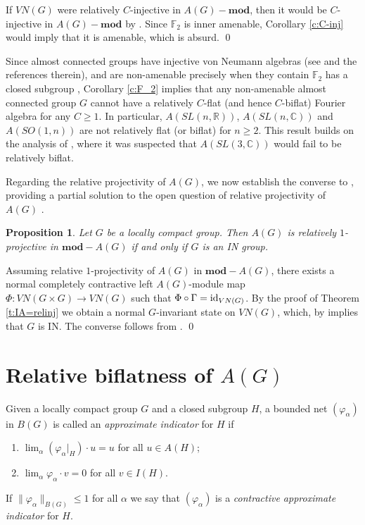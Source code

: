 \documentclass[preprint,12pt]{elsarticle}
\newtheorem{prop}[thm]{Proposition}
\newcommand{\e}[1]{\emph{#1}}
\newcommand{\LG}{VN(G)}
\newcommand{\vphi}{\varphi}
\newcommand{\Gam}{\Gamma}
\newcommand{\id}{\textnormal{id}}
\providecommand{\norm}[1]{\lVert#1\rVert}
\newcommand{\F}{\mathbb{F}}
\newcommand{\C}{\mathbb{C}}
\newcommand{\R}{\mathbb{R}}
\begin{document}
\begin{pf} If $\LG$ were relatively $C$-injective in $A(G)-\mathbf{mod}$, then it would be $C$-injective in $A(G)-\mathbf{mod}$ by \cite[Proposition 2.3]{C}. Since $\F_2$ is inner amenable, Corollary \ref{c:C-inj} would imply that it is amenable, which is absurd.
\qed\end{pf}

Since almost connected groups have injective von Neumann algebras (see \cite{Pat3} and the references therein), and are non-amenable precisely when they contain $\F_2$ has a closed subgroup \cite[Theorem 5.5]{Rick}, Corollary \ref{c:F_2} implies that any non-amenable almost connected group $G$ cannot have a relatively $C$-flat (and hence $C$-biflat) Fourier algebra for any $C\geq 1$. In particular, $A(SL(n,\R))$, $A(SL(n,\C))$ and $A(SO(1,n))$ are not relatively flat (or biflat) for $n\geq 2$. This result builds on the analysis of \cite[\S4]{ARS}, where it was suspected that $A(SL(3,\C))$ would fail to be relatively biflat.

Regarding the relative projectivity of $A(G)$, we now establish the converse to \cite[Lemma 3.2]{RX}, providing a partial solution to the open question of relative projectivity of $A(G)$ \cite[\S4]{FLS}.

\begin{prop} Let $G$ be a locally compact group. Then $A(G)$ is relatively $1$-projective in $\mathbf{mod}-A(G)$ if and only if $G$ is an IN group.
\end{prop}

\begin{pf} Assuming relative $1$-projectivity of $A(G)$ in $\mathbf{mod}-A(G)$, there exists a normal completely contractive left $A(G)$-module map $\Phi:VN(G\times G)\rightarrow\LG$ such that $\Phi\circ\Gam=\id_{\LG}$. By the proof of Theorem \ref{t:IA=relinj}    we obtain a normal $G$-invariant state on $\LG$, which, by \cite[Proposition 4.2]{Tay} implies that $G$ is IN. The converse follows from \cite[Lemma 3.2]{RX}.
\qed\end{pf}

\section{Relative biflatness of $A(G)$}\label{s:relbiflat}

Given a locally compact group $G$ and a closed subgroup $H$, a bounded net $(\vphi_\alpha)$ in $B(G)$ is called an \e{approximate indicator} for $H$ \cite[Definition 2.1]{ARS} if
\begin{enumerate}
\item $\lim_{\alpha} (\vphi_{\alpha}|_{H})\cdot u=u$ for all $u\in A(H)$;
\item $\lim_{\alpha} \vphi_{\alpha}\cdot v=0$ for all $v\in I(H)$.
\end{enumerate}
If $\norm{\vphi_\alpha}_{B(G)}\leq 1$ for all $\alpha$ we say that $(\vphi_\alpha)$ is a \e{contractive approximate indicator} for $H$.
\end{document}
